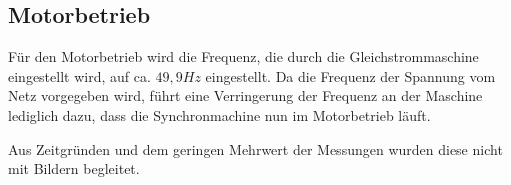 \documentclass{report}
\begin{document}
\subsection{Motorbetrieb}
\label{sec:motorbetrieb}

Für den Motorbetrieb wird die Frequenz, die durch die Gleichstrommaschine eingestellt wird, auf ca. $49,9Hz$ eingestellt. Da die Frequenz der Spannung vom Netz vorgegeben wird, führt eine Verringerung der Frequenz an der Maschine lediglich dazu, dass die Synchronmachine nun im Motorbetrieb läuft.

Aus Zeitgründen und dem geringen Mehrwert der Messungen wurden diese nicht mit Bildern begleitet.
\end{document}
